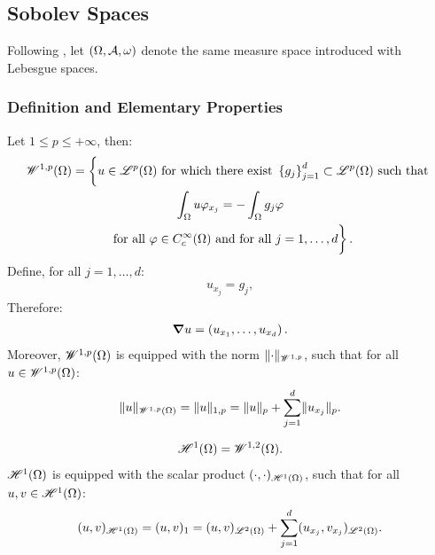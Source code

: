 \newpage
\subsection{Sobolev Spaces}

Following \cite[p. 267]{Brezis2010}, let $(\Omega, \mathcal{A}, \omega)$ denote the same measure space introduced with Lebesgue spaces.

\subsubsection{Definition and Elementary Properties}

\begin{definition}
    Let $1 \leq p \leq +\infty$, then:
    \begin{gather}
        \SpaceWkp{1}{p}(\Omega) = \left\{ \vphantom{\int_{\Omega}} u \in \SpaceLp{p}(\Omega) \text{ for which there exist } \left\{ g_j \right\}_{j = 1}^{d} \subset \SpaceLp{p}(\Omega) \text{ such that } \right. \notag \\ 
        \left. \int_{\Omega} u \varphi_{x_j} = - \int_{\Omega} g_j \varphi \right. \notag \\
        \left. \text{ for all } \varphi \in C_c^{\infty}(\Omega) \text{ and for all } j = 1, \dots, d \vphantom{\int_{\Omega}} \right\}.
    \end{gather}
    Define, for all $j = 1, \dots, d$:
    \begin{gather}
        u_{x_j} = g_j,
    \end{gather}
    Therefore:
    \begin{gather}
        \bm{\nabla} u = \left( u_{x_1}, \dots, u_{x_d} \right).
    \end{gather}
    Moreover, $\mathscr{W}^{1, p}(\Omega)$ is equipped with the norm $\lVert \cdot \rVert_{\mathscr{W}^{1, p}}$, such that for all $u \in \mathscr{W}^{1, p}(\Omega)$:
    \begin{gather}
        \lVert u \rVert_{\mathscr{W}^{1, p}(\Omega)} = \lVert u \rVert_{1, p} = \lVert u \rVert_p + \sum_{j = 1}^d \lVert u_{x_j} \rVert_p.
    \end{gather}
\end{definition}

\begin{definition}
    \begin{gather}
        \mathscr{H}^{1}(\Omega) = \mathscr{W}^{1, 2}(\Omega).
    \end{gather}
    $\mathscr{H}^{1}(\Omega)$ is equipped with the scalar product $(\cdot, \cdot)_{\mathscr{H}^{1}(\Omega)}$, such that for all $u, v \in \mathscr{H}^{1}(\Omega)$:
    \begin{gather}
        (u, v)_{\mathscr{H}^{1}(\Omega)} = (u, v)_1 = (u, v)_{\mathscr{L}^{2}(\Omega)} + \sum_{j = 1}^d (u_{x_j}, v_{x_j})_{\mathscr{L}^{2}(\Omega)}.
    \end{gather}
\end{definition}

